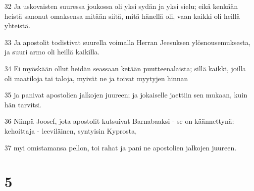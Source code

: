 \par 32 Ja uskovaisten suuressa joukossa oli yksi sydän ja yksi sielu; eikä kenkään heistä sanonut omaksensa mitään siitä, mitä hänellä oli, vaan kaikki oli heillä yhteistä.
\par 33 Ja apostolit todistivat suurella voimalla Herran Jeesuksen ylösnousemuksesta, ja suuri armo oli heillä kaikilla.
\par 34 Ei myöskään ollut heidän seassaan ketään puutteenalaista; sillä kaikki, joilla oli maatiloja tai taloja, myivät ne ja toivat myytyjen hinnan
\par 35 ja panivat apostolien jalkojen juureen; ja jokaiselle jaettiin sen mukaan, kuin hän tarvitsi.
\par 36 Niinpä Joosef, jota apostolit kutsuivat Barnabaaksi - se on käännettynä: kehoittaja - leeviläinen, syntyisin Kyprosta,
\par 37 myi omistamansa pellon, toi rahat ja pani ne apostolien jalkojen juureen.

\chapter{5}

